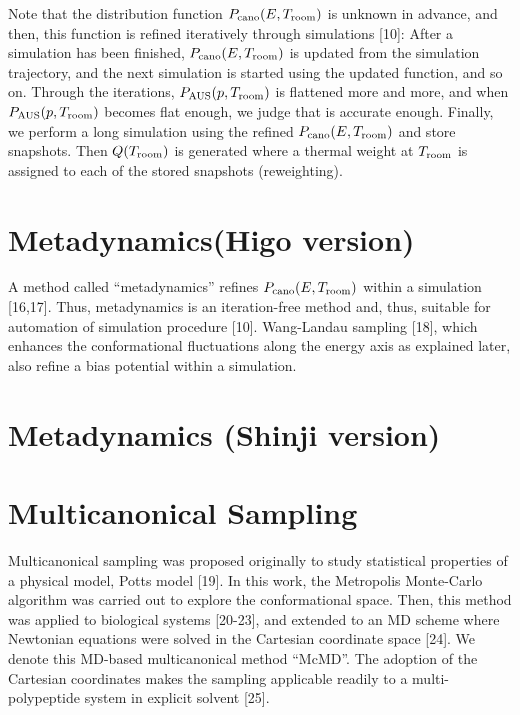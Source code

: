 Note that the distribution function $P_{\rm cano}(E,T_{\rm room})$ is unknown in advance, and then, this function is refined iteratively through simulations [10]: After a simulation has been finished, $P_{\rm cano}(E,T_{\rm room})$ is updated from the simulation trajectory, and the next simulation is started using the updated function, and so on. Through the iterations, $P_{\rm AUS}(p,T_{\rm room})$ is flattened more and more, and when $P_{\rm AUS}(p,T_{\rm room})$ becomes flat enough, we judge that  is accurate enough. Finally, we perform a long simulation using the refined $P_{\rm cano}(E,T_{\rm room})$ and store snapshots. Then $Q(T_{\rm room})$ is generated where a thermal weight at $T_{\rm room}$ is assigned to each of the stored snapshots (reweighting).

\section{Metadynamics(Higo version)}
A method called “metadynamics” refines $P_{\rm cano}(E,T_{\rm room})$ within a simulation [16,17]. Thus, metadynamics is an iteration-free method and, thus, suitable for automation of simulation procedure [10]. Wang-Landau sampling [18], which enhances the conformational fluctuations along the energy axis as explained later, also refine a bias potential within a simulation.
\section{Metadynamics (Shinji version)}

\section{Multicanonical Sampling}
Multicanonical sampling was proposed originally to study statistical properties of a physical model, Potts model [19]. In this work, the Metropolis Monte-Carlo algorithm was carried out to explore the conformational space. Then, this method was applied to biological systems [20-23], and extended to an MD scheme where Newtonian equations were solved in the Cartesian coordinate space [24]. We denote this MD-based multicanonical method “McMD”. The adoption of the Cartesian coordinates makes the sampling applicable readily to a multi-polypeptide system in explicit solvent [25]. 

